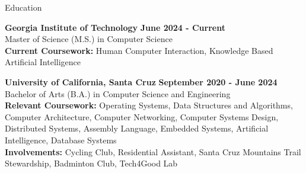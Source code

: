 \documentclass{resume}
\begin{document}
\begin{rSection}{\large Education}

{\bf Georgia Institute of Technology} \hfill {\bf{June 2024 - Current}}
\\ Master of Science (M.S.) in Computer Science\hfill %
\\ \textbf{Current Coursework:} Human Computer Interaction, Knowledge Based Artificial Intelligence


{\bf University of California, Santa Cruz} \hfill {\bf{September 2020 - June 2024}}
\\ Bachelor of Arts (B.A.) in Computer Science and Engineering\hfill %
\\ \textbf{Relevant Coursework:} Operating Systems, Data Structures and Algorithms, Computer Architecture, Computer Networking, Computer Systems Design, Distributed Systems, Assembly Language, Embedded Systems, Artificial Intelligence, Database Systems
\\ \textbf{Involvements:} Cycling Club, Residential Assistant, Santa Cruz Mountains Trail Stewardship, Badminton Club, Tech4Good Lab

\end{rSection}
\end{document}
